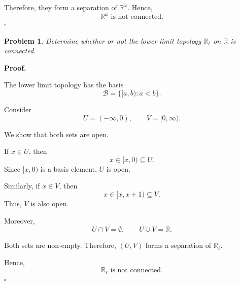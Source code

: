 \documentclass[11pt,a4paper]{article}
\newcommand{\R}{\mathbb{R}}
\newcommand{\Rw}{\mathbb{R}^{\omega}}
\newcommand{\Rl}{\mathbb{R}_{\ell}}
\newtheorem*{problem}{Problem}
\begin{document}
Therefore, they form a separation of $\Rw$.
Hence,
\[
\boxed{\Rw\text{ is not connected.}}
\]
\hfill $\square$

\vspace{0.5cm}


\begin{problem}
Determine whether or not the lower limit topology
$\Rl$ on $\R$ is connected.
\end{problem}

\textbf{Proof.}

The lower limit topology has the basis
\[
\mathcal{B}=\{[a,b):a<b\}.
\]

Consider
\[
U=(-\infty,0),\qquad V=[0,\infty).
\]

We show that both sets are open.

If $x\in U$, then
\[
x\in[x,0)\subseteq U.
\]
Since $[x,0)$ is a basis element, $U$ is open.

Similarly, if $x\in V$, then
\[
x\in[x,x+1)\subseteq V.
\]
Thus, $V$ is also open.

Moreover,
\[
U\cap V=\emptyset,
\qquad U\cup V=\R.
\]

Both sets are non-empty. Therefore, $(U,V)$
forms a separation of $\Rl$.

Hence,
\[
\boxed{\Rl\text{ is not connected.}}
\]
\hfill $\square$
\end{document}
